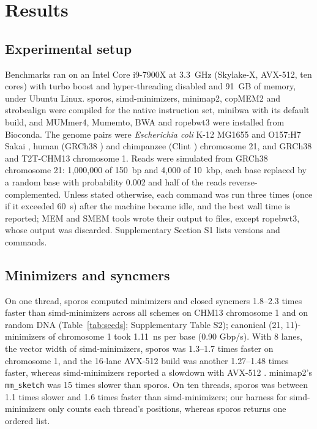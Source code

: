 \section{Results}

\subsection{Experimental setup}

Benchmarks ran on an Intel Core i9-7900X at 3.3~GHz (Skylake-X, AVX-512, ten cores) with turbo boost and hyper-threading disabled and 91~GB of memory, under Ubuntu Linux. sporos, simd-minimizers, minimap2, copMEM2 and strobealign were compiled for the native instruction set, minibwa with its default build, and MUMmer4, Mumemto, BWA and ropebwt3 were installed from Bioconda. The genome pairs were \emph{Escherichia coli} K-12 MG1655 and O157:H7 Sakai \citep{Blattner1997,Hayashi2001}, human (GRCh38 \citep{Schneider2017}) and chimpanzee (Clint \citep{Yoo2025}) chromosome 21, and GRCh38 and T2T-CHM13 \citep{Nurk2022} chromosome 1. Reads were simulated from GRCh38 chromosome 21: 1{,}000,000 of 150~bp and 4{,}000 of 10~kbp, each base replaced by a random base with probability 0.002 and half of the reads reverse-complemented. Unless stated otherwise, each command was run three times (once if it exceeded 60~s) after the machine became idle, and the best wall time is reported; MEM and SMEM tools wrote their output to files, except ropebwt3, whose output was discarded. Supplementary Section S1 lists versions and commands.

\subsection{Minimizers and syncmers}

On one thread, sporos computed minimizers and closed syncmers 1.8--2.3 times faster than simd-minimizers across all schemes on CHM13 chromosome 1 and on random DNA (Table~\ref{tab:seeds}; Supplementary Table S2); canonical (21, 11)-minimizers of chromosome 1 took 1.11~ns per base (0.90 Gbp/s). With 8 lanes, the vector width of simd-minimizers, sporos was 1.3--1.7 times faster on chromosome 1, and the 16-lane AVX-512 build was another 1.27--1.48 times faster, whereas simd-minimizers reported a slowdown with AVX-512 \citep{GrootKoerkamp2025simd}. minimap2's \texttt{mm\_sketch} was 15 times slower than sporos. On ten threads, sporos was between 1.1 times slower and 1.6 times faster than simd-minimizers; our harness for simd-minimizers only counts each thread's positions, whereas sporos returns one ordered list.

